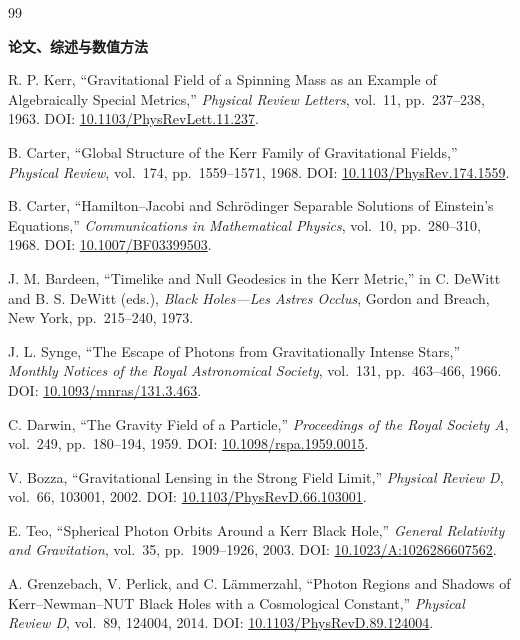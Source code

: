 \documentclass[UTF8,11pt,a4paper,fontset=fandol]{ctexart}
\begin{document}
\clearpage
{}
{}
\begin{thebibliography}{99}

\item[]\textbf{论文、综述与数值方法}

R. P. Kerr, ``Gravitational Field of a Spinning Mass as an Example of Algebraically Special Metrics,'' \emph{Physical Review Letters}, vol.~11, pp.~237--238, 1963. DOI: \href{https://doi.org/10.1103/PhysRevLett.11.237}{10.1103/PhysRevLett.11.237}.

B. Carter, ``Global Structure of the Kerr Family of Gravitational Fields,'' \emph{Physical Review}, vol.~174, pp.~1559--1571, 1968. DOI: \href{https://doi.org/10.1103/PhysRev.174.1559}{10.1103/PhysRev.174.1559}.

B. Carter, ``Hamilton--Jacobi and Schrödinger Separable Solutions of Einstein's Equations,'' \emph{Communications in Mathematical Physics}, vol.~10, pp.~280--310, 1968. DOI: \href{https://doi.org/10.1007/BF03399503}{10.1007/BF03399503}.

J. M. Bardeen, ``Timelike and Null Geodesics in the Kerr Metric,'' in C. DeWitt and B. S. DeWitt (eds.), \emph{Black Holes---Les Astres Occlus}, Gordon and Breach, New York, pp.~215--240, 1973.

J. L. Synge, ``The Escape of Photons from Gravitationally Intense Stars,'' \emph{Monthly Notices of the Royal Astronomical Society}, vol.~131, pp.~463--466, 1966. DOI: \href{https://doi.org/10.1093/mnras/131.3.463}{10.1093/mnras/131.3.463}.

C. Darwin, ``The Gravity Field of a Particle,'' \emph{Proceedings of the Royal Society A}, vol.~249, pp.~180--194, 1959. DOI: \href{https://doi.org/10.1098/rspa.1959.0015}{10.1098/rspa.1959.0015}.

V. Bozza, ``Gravitational Lensing in the Strong Field Limit,'' \emph{Physical Review D}, vol.~66, 103001, 2002. DOI: \href{https://doi.org/10.1103/PhysRevD.66.103001}{10.1103/PhysRevD.66.103001}.

E. Teo, ``Spherical Photon Orbits Around a Kerr Black Hole,'' \emph{General Relativity and Gravitation}, vol.~35, pp.~1909--1926, 2003. DOI: \href{https://doi.org/10.1023/A:1026286607562}{10.1023/A:1026286607562}.

A. Grenzebach, V. Perlick, and C. L\"ammerzahl, ``Photon Regions and Shadows of Kerr--Newman--NUT Black Holes with a Cosmological Constant,'' \emph{Physical Review D}, vol.~89, 124004, 2014. DOI: \href{https://doi.org/10.1103/PhysRevD.89.124004}{10.1103/PhysRevD.89.124004}.


\end{thebibliography}
\end{document}
